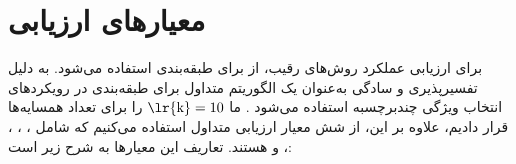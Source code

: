 \section{معیارهای ارزیابی}

برای ارزیابی عملکرد روش‌های رقیب، از  \cite{zhang2007ml} برای طبقه‌بندی استفاده می‌شود.  به دلیل تفسیرپذیری و سادگی به‌عنوان یک الگوریتم متداول برای طبقه‌بندی در رویکردهای انتخاب ویژگی چندبرچسبه استفاده می‌شود \cite{liu2018online,zhang2019manifold,jian2016multi,hu2020multi}. ما $\text{\lr{k}}= 10$ را برای تعداد همسایه‌ها قرار دادیم، علاوه بر این، از شش معیار ارزیابی متداول استفاده می‌کنیم که شامل ، ، ، ،  و  هستند. تعاریف این معیارها به شرح زیر است:

